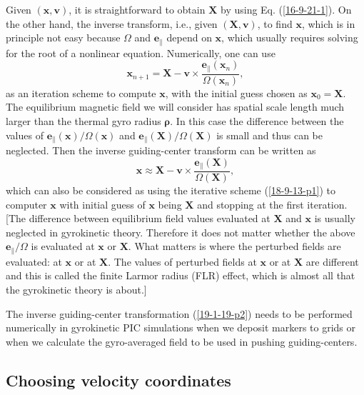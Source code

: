 \documentclass{article}
\newcommand{\tmmathbf}[1]{\ensuremath{\boldsymbol{#1}}}
\begin{document}
Given $(\mathbf{x}, \mathbf{v})$, it is straightforward to obtain $\mathbf{X}$
by using Eq. (\ref{16-9-21-1}). On the other hand, the inverse transform,
i.e., given $(\mathbf{X}, \mathbf{v})$, to find $\mathbf{x}$, which is in
principle not easy because $\Omega$ and $\mathbf{e}_{\parallel}$ depend on
$\mathbf{x}$, which usually requires solving for the root of a nonlinear
equation. Numerically, one can use
\begin{equation}
  \label{18-9-13-p1} \mathbf{x}_{n + 1} =\mathbf{X}-\mathbf{v} \times
  \frac{\tmmathbf{e}_{\parallel} (\mathbf{x}_n)}{\Omega (\mathbf{x}_n)},
\end{equation}
as an iteration scheme to compute $\mathbf{x}$, with the initial guess chosen
as $\mathbf{x}_0 =\mathbf{X}$. The equilibrium magnetic field we will consider
has spatial scale length much larger than the thermal gyro radius
$\tmmathbf{\rho}$. In this case the difference between the values of
$\mathbf{e}_{\parallel} (\mathbf{x}) / \Omega (\mathbf{x})$ and
$\mathbf{e}_{\parallel} (\mathbf{X}) / \Omega (\mathbf{X})$ is small and thus
can be neglected. Then the inverse guiding-center transform can be written as
\begin{equation}
  \label{19-1-19-p2} \mathbf{x} \approx \mathbf{X}-\mathbf{v} \times
  \frac{\tmmathbf{e}_{\parallel} (\mathbf{X})}{\Omega (\mathbf{X})},
\end{equation}
which can also be considered as using the iterative scheme (\ref{18-9-13-p1})
to computer $\mathbf{x}$ with initial guess of $\mathbf{x}$ being $\mathbf{X}$
and stopping at the first iteration. [The difference between equilibrium field
values evaluated at $\mathbf{X}$ and $\mathbf{x}$ is usually neglected in
gyrokinetic theory. Therefore it does not matter whether the above
$\mathbf{e}_{\parallel} / \Omega$ is evaluated at $\mathbf{x}$ or
$\mathbf{X}$. What matters is where the perturbed fields are evaluated: at
$\mathbf{x}$ or at $\mathbf{X}$. The values of perturbed fields at
$\mathbf{x}$ or at $\mathbf{X}$ are different and this is called the finite
Larmor radius (FLR) effect, which is almost all that the gyrokinetic theory is
about.]

The inverse guiding-center transformation (\ref{19-1-19-p2}) needs to be
performed numerically in gyrokinetic PIC simulations when we deposit markers
to grids or when we calculate the gyro-averaged field to be used in pushing
guiding-centers.

\subsection{Choosing velocity coordinates}
\end{document}
